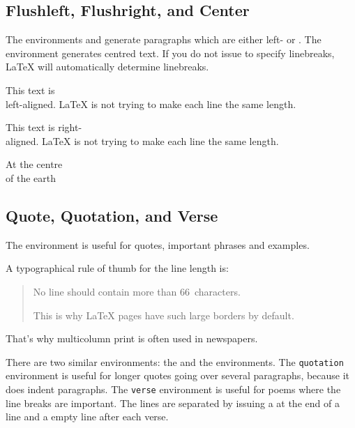 \subsection{Flushleft, Flushright, and Center}

The environments  and  generate
paragraphs which are either left- or .  The  environment generates centred text. If you
do not issue \ci{\bs} to specify linebreaks, \LaTeX{} will
automatically determine linebreaks.

\begin{example}
\begin{flushleft}
This text is\\ left-aligned. 
\LaTeX{} is not trying to make 
each line the same length.
\end{flushleft}
\end{example}

\begin{example}
\begin{flushright}
This text is right-\\aligned. 
\LaTeX{} is not trying to make
each line the same length.
\end{flushright}
\end{example}

\begin{example}
\begin{center}
At the centre\\of the earth
\end{center}
\end{example}

\subsection{Quote, Quotation, and Verse}

The  environment is useful for quotes, important phrases and
examples.

\begin{example}
A typographical rule of thumb
for the line length is:
\begin{quote}
No line should contain more than
66~characters.

This is why \LaTeX{} pages have 
such large borders by default.
\end{quote}
That's why multicolumn print is
often used in newspapers.
\end{example}

There are two similar environments: the  and the
 environments. The \texttt{quotation} environment is useful
for longer quotes going over several paragraphs, because it does
indent paragraphs. The \texttt{verse} environment is useful for poems
where the line breaks are important. The lines are separated by
issuing a \ci{\bs} at the end of a line and a empty line after each
verse.


